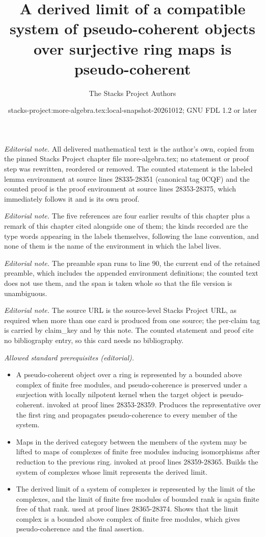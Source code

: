 \documentclass[10pt,a4paper]{amsart}
\title{A derived limit of a compatible system of pseudo-coherent objects over surjective ring maps is pseudo-coherent}
\author{The Stacks Project Authors}
\date{stacks-project:more-algebra.tex:local-snapshot-20261012; GNU FDL 1.2 or later}
\theoremstyle{plain}
\theoremstyle{definition}
\theoremstyle{remark}
\numberwithin{equation}{subsection}
\begin{document}
\maketitle
\setcounter{subsection}{1}
\noindent\textit{Editorial note.} All delivered mathematical text is the author's own, copied from the pinned Stacks Project chapter file more-algebra.tex; no statement or proof step was rewritten, reordered or removed. The counted statement is the labeled lemma environment at source lines 28335-28351 (canonical tag 0CQF) and the counted proof is the proof environment at source lines 28353-28375, which immediately follows it and is its own proof.\par\medskip
\noindent\textit{Editorial note.} The five references are four earlier results of this chapter plus a remark of this chapter cited alongside one of them; the kinds recorded are the type words appearing in the labels themselves, following the lane convention, and none of them is the name of the environment in which the label lives.\par\medskip
\noindent\textit{Editorial note.} The preamble span runs to line 90, the current end of the retained preamble, which includes the appended environment definitions; the counted text does not use them, and the span is taken whole so that the file version is unambiguous.\par\medskip
\noindent\textit{Editorial note.} The source URL is the source-level Stacks Project URL, as required when more than one card is produced from one source; the per-claim tag is carried by claim\_key and by this note. The counted statement and proof cite no bibliography entry, so this card needs no bibliography.\par\medskip
\noindent\textit{Allowed standard prerequisites (editorial).}\begin{itemize}
\item A pseudo-coherent object over a ring is represented by a bounded above complex of finite free modules, and pseudo-coherence is preserved under a surjection with locally nilpotent kernel when the target object is pseudo-coherent. invoked at proof lines 28353-28359. Produces the representative over the first ring and propagates pseudo-coherence to every member of the system.
\item Maps in the derived category between the members of the system may be lifted to maps of complexes of finite free modules inducing isomorphisms after reduction to the previous ring. invoked at proof lines 28359-28365. Builds the system of complexes whose limit represents the derived limit.
\item The derived limit of a system of complexes is represented by the limit of the complexes, and the limit of finite free modules of bounded rank is again finite free of that rank. used at proof lines 28365-28374. Shows that the limit complex is a bounded above complex of finite free modules, which gives pseudo-coherence and the final assertion.
\end{itemize}\medskip
\end{document}
